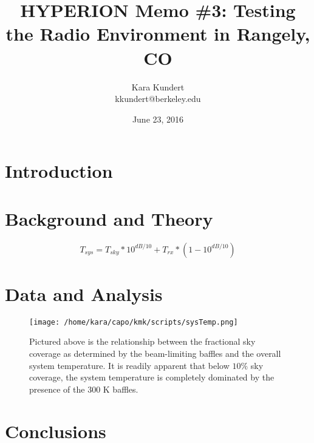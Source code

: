 \documentclass[11pt]{article}
\makeatletter
\newcommand{\thetitle}{HYPERION Memo \#3: Testing the Radio Environment in 
Rangely, CO}
\newcommand{\theauthor}{Kara Kundert}
\newcommand{\theauthorsemail}{kkundert@berkeley.edu}
\newcommand{\thedate}{June 23, 2016}
\makeatother
\begin{document}
\title{
    \sffamily\bfseries\huge
    \thetitle \\
}
\author{
    \sffamily\theauthor \\
    \sffamily\theauthorsemail
}
\date{\thedate}
\maketitle
\sloppy

\section{Introduction}


\section{Background and Theory}

\begin{equation}
    \label{eq:sys-temp}
    T_{sys} = T_{sky} * 10^{dB/10} + T_{rx} * (1 - 10^{dB/10})
\end{equation}



\section{Data and Analysis}

\begin{figure}
    \begin{center}
    \texttt{[image: /home/kara/capo/kmk/scripts/sysTemp.png]}
    \end{center}
    \caption{
        Pictured above is the relationship between the fractional sky coverage 
        as determined by the beam-limiting baffles and the overall system 
        temperature. It is readily apparent that below $10\%$ sky coverage, the 
        system temperature is completely dominated by the presence of the 300 K 
        baffles.
    }
    \label{fig:sys-temp}
\end{figure}

\section{Conclusions}


{}

\end{document}
